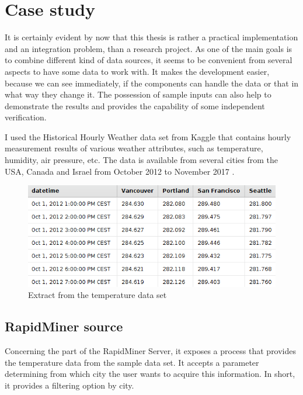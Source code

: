 \chapter{Case study} \label{case-study}

It is certainly evident by now that this thesis is rather a practical implementation and an integration problem, than a research project. As one of the main goals is to combine different kind of data sources, it seems to be convenient from several aspects to have some data to work with. It makes the development easier, because we can see immediately, if the components can handle the data or that in what way they change it. The possession of sample inputs can also help to demonstrate the results and provides the capability of some independent verification.

I used the Historical Hourly Weather data set from Kaggle that contains hourly measurement results of various weather attributes, such as temperature, humidity, air pressure, etc. The data is available from several cities from the USA, Canada and Israel from October 2012 to November 2017 \cite{kaggle-data}.

\begin{figure}[h]
	\centering
	\includegraphics[width=130mm, keepaspectratio]{figures/weather-data-extract.png}
	\caption{Extract from the temperature data set}
	\label{fig:weather-data-extract}
\end{figure}

\section{RapidMiner source}

Concerning the part of the RapidMiner Server, it exposes a process that provides the temperature data from the sample data set. It accepts a parameter determining from which city the user wants to acquire this information. In short, it provides a filtering option by city.

